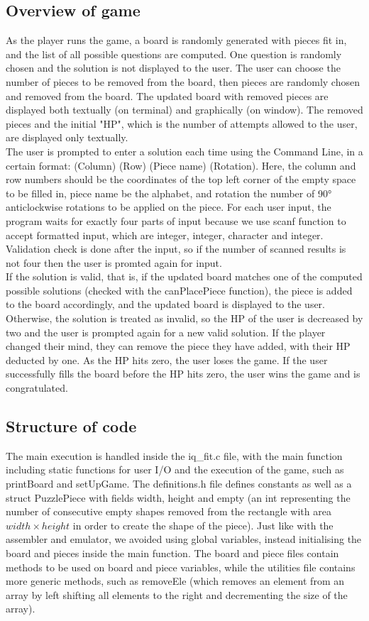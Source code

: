 \documentclass{article}
\begin{document}
\subsection{Overview of game}
As the player runs the game, a board is randomly generated with pieces fit in, and the list of all possible questions are computed. One question is randomly chosen and the solution is not displayed to the user. The user can choose the number of pieces to be removed from the board, then pieces are randomly chosen and removed from the board. The updated board with removed pieces are displayed both textually (on terminal) and graphically (on window). The removed pieces and the initial "HP", which is the number of attempts allowed to the user, are displayed only textually. \\
The user is prompted to enter a solution each time using the Command Line, in a certain format: (Column) (Row) (Piece name) (Rotation). Here, the column and row numbers should be the coordinates of the top left corner of the empty space to be filled in, piece name be the alphabet, and rotation the number of 90° anticlockwise rotations to be applied on the piece. For each user input, the program waits for exactly four parts of input because we use scanf function to accept formatted input, which are integer, integer, character and integer. Validation check is done after the input, so if the number of scanned results is not four then the user is promted again for input. \\
If the solution is valid, that is, if the updated board matches one of the computed possible solutions (checked with the canPlacePiece function), the piece is added to the board accordingly, and the updated board is displayed to the user. Otherwise, the solution is treated as invalid, so the HP of the user is decreased by two and the user is prompted again for a new valid solution. If the player changed their mind, they can remove the piece they have added, with their HP deducted by one. As the HP hits zero, the user loses the game. If the user successfully fills the board before the HP hits zero, the user wins the game and is congratulated. 

\subsection{Structure of code}

The main execution is handled inside the iq\_fit.c file, with the main function including static functions for user I/O and the execution of the game, such as printBoard and setUpGame. The definitions.h file defines constants as well as a struct PuzzlePiece with fields width, height and empty (an int representing the number of consecutive empty shapes removed from the rectangle with area $width \times height$ in order to create the shape of the piece). Just like with the assembler and emulator, we avoided using global variables, instead initialising the board and pieces inside the main function. The board and piece files contain methods to be used on board and piece variables, while the utilities file contains more generic methods, such as removeEle (which removes an element from an array by left shifting all elements to the right and decrementing the size of the array).
\end{document}
